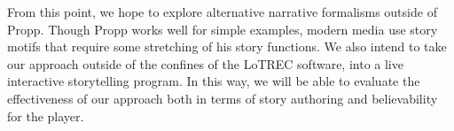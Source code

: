 \documentclass{llncs}
\begin{document}
From this point, we hope to explore alternative narrative formalisms outside of Propp. Though Propp works well for simple examples, modern media use story motifs that require some stretching of his story functions. We also intend to take our approach outside of the confines of the LoTREC software, into a live interactive storytelling program. In this way, we will be able to evaluate the effectiveness of our approach both in terms of story authoring and believability for the player.


\end{document}
